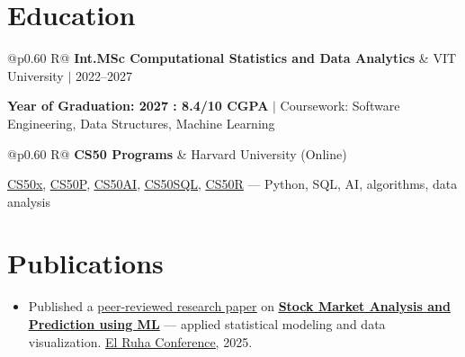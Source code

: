 \documentclass[a4paper,10pt]{article}
\newcommand{\ulink}[2]{\href{#1}{\uline{#2}}}
\newcommand{\subheading}[1]{{\color[HTML]{0A0A0A}\fontsize{12}{14}\selectfont\bfseries #1}}
\newcommand{\meta}[1]{{\color[HTML]{5C5C5C}\fontsize{10.5}{12.5}\selectfont #1}}
\begin{document}
\vspace{2pt}

\section{Education}
\vspace{2pt}

\begin{tabularx}{\linewidth}{@{}p{0.60\linewidth} R@{}}
\subheading{Int.MSc Computational Statistics and Data Analytics} & \meta{VIT University $|$ 2022--2027}
\end{tabularx}
\vspace{1pt}
{\color[HTML]{3A3A3A}\fontsize{11}{14}\selectfont \textbf{Year of Graduation: 2027 : 8.4/10 CGPA} $|$ Coursework: Software Engineering, Data Structures, Machine Learning}

\begin{tabularx}{\linewidth}{@{}p{0.60\linewidth} R@{}}
\subheading{CS50 Programs} & \meta{Harvard University (Online)}
\end{tabularx}
\vspace{1pt}
{\color[HTML]{3A3A3A}\fontsize{11}{14}\selectfont \ulink{https://cs50.harvard.edu/certificates/b14b78df-e05c-413e-a607-1dd27303053a}{CS50x}, \ulink{https://cs50.harvard.edu/certificates/32477052-9db4-49c4-a5a4-d7e58429ca2c}{CS50P}, \ulink{https://cs50.harvard.edu/certificates/9cdb4d4a-1250-4f8e-9fd7-191864e0f919}{CS50AI}, \ulink{https://cs50.harvard.edu/certificates/bc486f24-f085-4e61-8536-80940b97a1b9}{CS50SQL}, \ulink{https://cs50.harvard.edu/certificates/666838e6-a053-4d82-b179-a60fe745fd84}{CS50R} --- Python, SQL, AI, algorithms, data analysis}

\vspace{2pt}

\section{Publications}
\vspace{2pt}
\begin{itemize}[nosep, leftmargin=1.5em, itemsep=1pt, topsep=2pt]
  \item {\color[HTML]{0A0A0A}\fontsize{11}{14}\selectfont
  Published a \ulink{https://www.elruha.org/_files/ugd/614b1f_6b95e1b697bf452b9907ba46e0151c05.pdf\#page=774}{peer-reviewed research paper} on \ulink{https://github.com/su-jin1425/Set-Project}{\textbf{Stock Market Analysis and Prediction using ML}} --- applied statistical modeling and data visualization. \ulink{https://www.elruha.org/congress-books}{El Ruha Conference}, 2025.}
\end{itemize}
\end{document}
